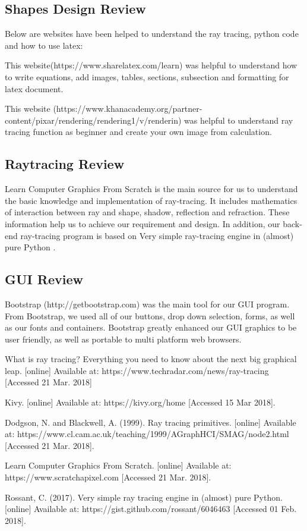 \documentclass[a4paper, 12pt]{article}
\begin{document}
\subsection{Shapes Design Review}
Below are websites have been helped to understand the ray tracing, python code and how to use latex:

This website(https://www.sharelatex.com/learn) was helpful to understand how to write equations, add images, tables, sections, subsection and formatting for latex document.

This website (https://www.khanacademy.org/partner-content/pixar/rendering/rendering1/v/renderin) was helpful to understand ray tracing function as beginner and create your own image from calculation.

\subsection{Raytracing Review}
Learn Computer Graphics From Scratch \cite{Learn Computer Graphics From Scratch} is the main  source for us to understand the basic knowledge and implementation of ray-tracing. It includes mathematics of interaction between ray and shape, shadow, reflection and refraction. These information help us to achieve our requirement and design. In addition, our back-end ray-tracing program is based on Very simple ray-tracing engine in (almost) pure Python \cite{Very simple ray-tracing engine in (almost) pure Python}. 

\subsection{GUI Review}
Bootstrap (http://getbootstrap.com) was the main tool for our GUI program. From Bootstrap, we used all of our buttons, drop down selection, forms, as well as our fonts and containers. Bootstrap greatly enhanced our GUI graphics to be user friendly, as well as portable to multi platform web browsers.


\begin{thebibliography}{9}

What is ray tracing? Everything you need to know about the next big graphical leap. [online] Available at: https://www.techradar.com/news/ray-tracing [Accessed 21 Mar. 2018]

Kivy. [online] Available at: https://kivy.org/home [Accessed 15 Mar 2018].

Dodgson, N. and Blackwell, A. (1999). Ray tracing primitives. [online] Available at: https://www.cl.cam.ac.uk/teaching/1999/AGraphHCI/SMAG/node2.html [Accessed 21 Mar. 2018].

Learn Computer Graphics From Scratch. [online] Available at: https://www.scratchapixel.com [Accessed 21 Mar. 2018].

Rossant, C. (2017). Very simple ray tracing engine in (almost) pure Python. [online] Available at: https://gist.github.com/rossant/6046463 [Accessed 01 Feb. 2018].
\end{thebibliography}
\end{document}
